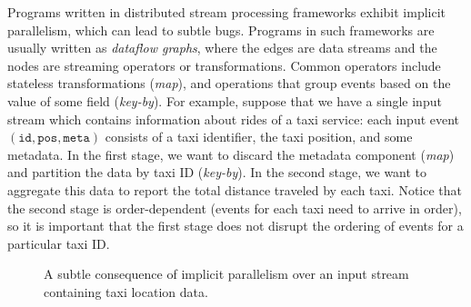 Programs written in distributed stream processing frameworks exhibit implicit parallelism, which can lead to subtle bugs. Programs in such frameworks are usually written as \emph{dataflow graphs}, where the edges are data streams and the nodes are streaming operators or transformations.
Common operators include stateless transformations (\emph{map}), and operations that group events based on the value of some field (\emph{key-by}).
For example, suppose that we have a single input stream which contains information about rides of a taxi service: each input event $(\texttt{id}, \texttt{pos}, \texttt{meta})$ consists of a taxi identifier, the taxi position, and some metadata. In the first stage, we want to discard the metadata component (\emph{map}) and partition the data by taxi ID (\emph{key-by}). In the second stage, we want to aggregate this data to report the total distance traveled by each taxi. Notice that the second stage is order-dependent (events for each taxi need to arrive in order), so it is important that the first stage does not disrupt the ordering of events for a particular taxi ID.

\begin{figure}[tb]
\centering
{}

\smallskip


\caption{A subtle consequence of implicit parallelism
over an input stream containing taxi location data.
}
\label{diffstream:ex:overview-simple}
\end{figure}

